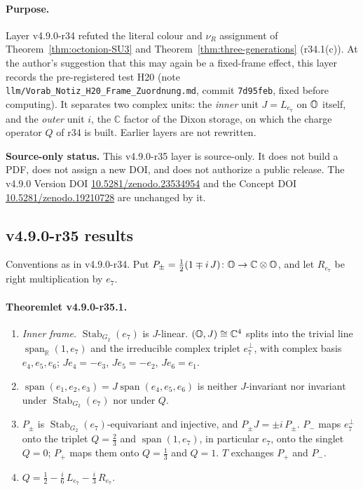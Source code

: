 \paragraph{Purpose.}
Layer v4.9.0-r34 refuted the literal colour and \(\nu_R\) assignment of Theorem~\ref{thm:octonion-SU3} and
Theorem~\ref{thm:three-generations} (r34.1(c)).  At the author's suggestion that this may again be a fixed-frame effect, this layer
records the pre-registered test H20 (note \texttt{llm/Vorab\_Notiz\_H20\_Frame\_Zuordnung.md}, commit \texttt{7d95feb}, fixed before
computing).  It separates two complex units: the \emph{inner} unit \(J=L_{e_7}\) on \(\mathbb{O}\) itself, and the \emph{outer} unit \(i\),
the \(\mathbb C\) factor of the Dixon storage, on which the charge operator \(Q\) of r34 is built.  Earlier layers are not rewritten.

\noindent\textbf{Source-only status.}
This v4.9.0-r35 layer is source-only.  It does not build a PDF, does not assign a new DOI,
and does not authorize a public release.  The v4.9.0 Version DOI
\href{https://doi.org/10.5281/zenodo.23534954}{10.5281/zenodo.23534954} and the Concept DOI
\href{https://doi.org/10.5281/zenodo.19210728}{10.5281/zenodo.19210728} are unchanged by it.

\subsection*{v4.9.0-r35 results}
\label{subsec:v490-r35-results}

Conventions as in v4.9.0-r34.  Put \(P_\pm=\tfrac12(1\mp i\,J)\colon\mathbb{O}\to\mathbb C\otimes\mathbb{O}\), and let \(R_{e_7}\) be right
multiplication by \(e_7\).

\paragraph{Theoremlet v4.9.0-r35.1.}
\begin{enumerate}[leftmargin=2em]
\item[(a)] \emph{Inner frame.}  \(\operatorname{Stab}_{G_2}(e_7)\) is \(J\)-linear.  \((\mathbb{O},J)\cong\mathbb C^4\) splits into the trivial
line \(\operatorname{span}_{\mathbb R}(1,e_7)\) and the irreducible complex triplet \(e_7^\perp\), with complex basis \(e_4,e_5,e_6\);
\(Je_4=-e_3\), \(Je_5=-e_2\), \(Je_6=e_1\).
\item[(b)] \(\operatorname{span}(e_1,e_2,e_3)=J\operatorname{span}(e_4,e_5,e_6)\) is neither \(J\)-invariant nor invariant under
\(\operatorname{Stab}_{G_2}(e_7)\) nor under \(Q\).
\item[(c)] \(P_\pm\) is \(\operatorname{Stab}_{G_2}(e_7)\)-equivariant and injective, and \(P_\pm J=\pm i\,P_\pm\).  \(P_-\) maps
\(e_7^\perp\) onto the triplet \(Q=\tfrac23\) and \(\operatorname{span}(1,e_7)\), in particular \(e_7\), onto the singlet \(Q=0\);
\(P_+\) maps them onto \(Q=\tfrac13\) and \(Q=1\).  \(T\) exchanges \(P_+\) and \(P_-\).
\item[(d)] \(Q=\tfrac12-\tfrac{i}{6}\,L_{e_7}-\tfrac{i}{3}\,R_{e_7}\).
\end{enumerate}

